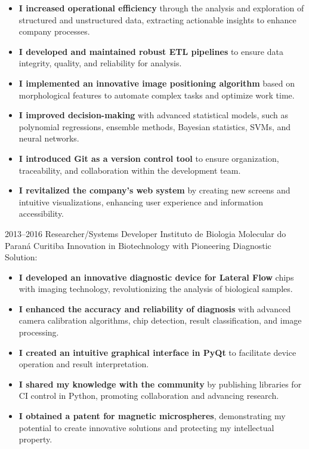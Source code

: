 \documentclass[11pt,a4paper,sans]{moderncv}        %
\begin{document}
\begin{itemize}%
  \item \textbf{I increased operational efficiency} through the analysis and exploration of structured and unstructured data, extracting actionable insights to enhance company processes.
  \item \textbf{I developed and maintained robust ETL pipelines} to ensure data integrity, quality, and reliability for analysis.
  \item \textbf{I implemented an innovative image positioning algorithm} based on morphological features to automate complex tasks and optimize work time.
  \item \textbf{I improved decision-making} with advanced statistical models, such as polynomial regressions, ensemble methods, Bayesian statistics, SVMs, and neural networks.
  \item \textbf{I introduced Git as a version control tool} to ensure organization, traceability, and collaboration within the development team.
  \item \textbf{I revitalized the company's web system} by creating new screens and intuitive visualizations, enhancing user experience and information accessibility.
\end{itemize}

\vspace{1em}
\cventry
{2013--2016}
{Researcher/Systems Developer}
{Instituto de Biologia Molecular do Paraná}
{Curitiba}{}
{Innovation in Biotechnology with Pioneering Diagnostic Solution:}

\begin{itemize}%
  \item \textbf{I developed an innovative diagnostic device for Lateral Flow} chips with imaging technology, revolutionizing the analysis of biological samples.
  \item \textbf{I enhanced the accuracy and reliability of diagnosis} with advanced camera calibration algorithms, chip detection, result classification, and image processing.
  \item \textbf{I created an intuitive graphical interface in PyQt} to facilitate device operation and result interpretation.
  \item \textbf{I shared my knowledge with the community} by publishing libraries for CI control in Python, promoting collaboration and advancing research.
  \item \textbf{I obtained a patent for magnetic microspheres}, demonstrating my potential to create innovative solutions and protecting my intellectual property.
\end{itemize}
\end{document}
